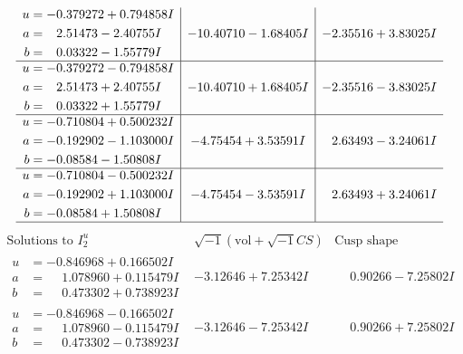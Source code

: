 \documentclass[1p]{elsarticle_modified}
\theoremstyle{definition}
\newcommand{\I}{\sqrt{-1}}
\begin{document}
$$\begin{array}{c|c|c}
\begin{aligned}
u &= -0.379272 + 0.794858 I \\
a &= \phantom{-}2.51473 - 2.40755 I \\
b &= \phantom{-}0.03322 - 1.55779 I\end{aligned}
 & -10.40710 - 1.68405 I & -2.35516 + 3.83025 I \\ \hline\begin{aligned}
u &= -0.379272 - 0.794858 I \\
a &= \phantom{-}2.51473 + 2.40755 I \\
b &= \phantom{-}0.03322 + 1.55779 I\end{aligned}
 & -10.40710 + 1.68405 I & -2.35516 - 3.83025 I \\ \hline\begin{aligned}
u &= -0.710804 + 0.500232 I \\
a &= -0.192902 - 1.103000 I \\
b &= -0.08584 - 1.50808 I\end{aligned}
 & -4.75454 + 3.53591 I & \phantom{-}2.63493 - 3.24061 I \\ \hline\begin{aligned}
u &= -0.710804 - 0.500232 I \\
a &= -0.192902 + 1.103000 I \\
b &= -0.08584 + 1.50808 I\end{aligned}
 & -4.75454 - 3.53591 I & \phantom{-}2.63493 + 3.24061 I\\
 \hline 
 \end{array}$$\newpage$$\begin{array}{c|c|c}  
\text{Solutions to }I^u_{2}& \I (\text{vol} + \sqrt{-1}CS) & \text{Cusp shape}\\
 \hline 
\begin{aligned}
u &= -0.846968 + 0.166502 I \\
a &= \phantom{-}1.078960 + 0.115479 I \\
b &= \phantom{-}0.473302 + 0.738923 I\end{aligned}
 & -3.12646 + 7.25342 I & \phantom{-}0.90266 - 7.25802 I \\ \hline\begin{aligned}
u &= -0.846968 - 0.166502 I \\
a &= \phantom{-}1.078960 - 0.115479 I \\
b &= \phantom{-}0.473302 - 0.738923 I\end{aligned}
 & -3.12646 - 7.25342 I & \phantom{-}0.90266 + 7.25802 I \\ \hline\begin{aligned}

\end{aligned}
\end{array}$$
\end{document}
